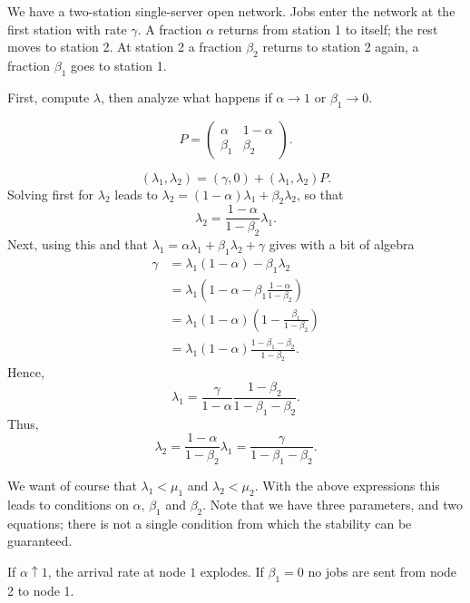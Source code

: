 \documentclass[companion]{subfiles}
\begin{document}
\begin{exercise}
We have a two-station single-server open network.
Jobs enter the network at the first station with rate $\gamma$.
A fraction $\alpha$ returns from station 1 to itself; the rest moves to station 2.
At station 2 a fraction $\beta_2$ returns to station 2 again, a fraction $\beta_1$ goes to station 1.

First, compute $\lambda$, then analyze what happens if $\alpha\to 1$ or $\beta_1\to 0$.
\begin{solution}
 \begin{equation*}
 P = 
 \begin{pmatrix}
 \alpha & 1- \alpha \\
 \beta_1 & \beta_2
 \end{pmatrix}.
 \end{equation*}

 \begin{equation*}
 (\lambda_1, \lambda_2) = (\gamma, 0) + (\lambda_1, \lambda_2) P.
 \end{equation*}
Solving first for $\lambda_2$ leads to $\lambda_2 = (1-\alpha) \lambda_1 + \beta_2 \lambda_2$, so that 
\begin{equation*}
 \lambda_2 = \frac{1-\alpha}{1-\beta_2} \lambda_1. 
\end{equation*}
Next, using this and that $\lambda_1 = \alpha \lambda_1 + \beta_1 \lambda_2 + \gamma$ gives with a bit of algebra
\begin{equation*}
 \begin{split}
\gamma 
&= \lambda_1(1-\alpha) - \beta_1\lambda_2 \\
&= \lambda_1\left(1-\alpha - \beta_1\frac{1-\alpha}{1-\beta_2}\right) \\
&= \lambda_1(1-\alpha)\left(1 - \frac{\beta_1 }{1-\beta_2}\right) \\
&= \lambda_1(1-\alpha)\frac{1-\beta_1-\beta_2 }{1-\beta_2}.
 \end{split}
\end{equation*}
Hence, 
\begin{equation*}
 \lambda_1 = \frac\gamma{1-\alpha}\frac{1-\beta_2}{1-\beta_1-\beta_2}. 
\end{equation*}
Thus, 
\begin{equation*}
 \lambda_2 = \frac{1-\alpha}{1-\beta_2} \lambda_1 = \frac\gamma{1-\beta_1-\beta_2}. 
\end{equation*}


We want of course that $\lambda_1 < \mu_1$ and $\lambda_2 < \mu_2$.
With the above expressions this leads to conditions on $\alpha$, $\beta_1$ and $\beta_2$.
Note that we have three parameters, and two equations; there is not a single condition from which the stability can be guaranteed.

If $\alpha\uparrow 1$, the arrival rate at node $1$ explodes.
If $\beta_1=0$ no jobs are sent from node 2 to node 1.
\end{solution}
\end{exercise}
\end{document}
